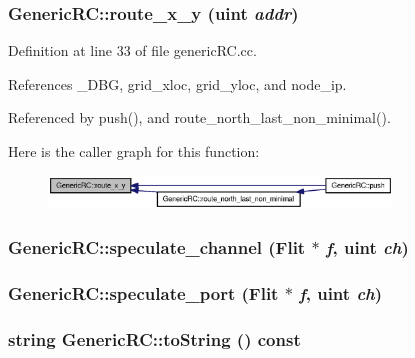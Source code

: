 \subsubsection[{route\_\-x\_\-y}]{ GenericRC::route\_\-x\_\-y ({\bf uint} {\em addr})\hspace{0.3cm}{\tt  [private]}}\label{classGenericRC_783f80da9e6aa41e6e91af1403db3270}




Definition at line 33 of file genericRC.cc.

References \_\-DBG, grid\_\-xloc, grid\_\-yloc, and node\_\-ip.

Referenced by push(), and route\_\-north\_\-last\_\-non\_\-minimal().

Here is the caller graph for this function:\nopagebreak
\begin{figure}[H]
\begin{center}
\leavevmode
\includegraphics[width=259pt]{classGenericRC_783f80da9e6aa41e6e91af1403db3270_icgraph}
\end{center}
\end{figure}
\subsubsection[{speculate\_\-channel}]{ GenericRC::speculate\_\-channel ({\bf Flit} $\ast$ {\em f}, \/  {\bf uint} {\em ch})}\label{classGenericRC_2ebb540e1ca3fea96176908a9d21a3ad}


\subsubsection[{speculate\_\-port}]{ GenericRC::speculate\_\-port ({\bf Flit} $\ast$ {\em f}, \/  {\bf uint} {\em ch})}\label{classGenericRC_2607d570efd24c62511def45adceb067}


\subsubsection[{toString}]{\setlength{\rightskip}{0pt plus 5cm}string GenericRC::toString () const}\label{classGenericRC_214ef51af1dd900b41bb98b4826b5af4}




